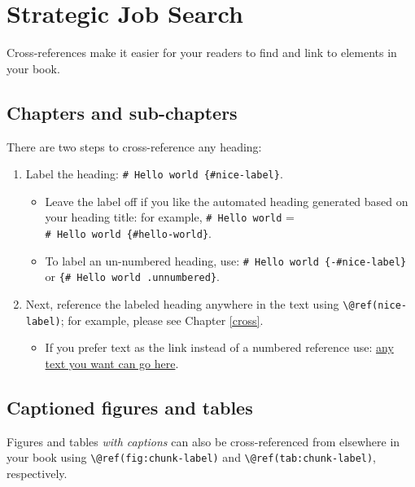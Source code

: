 \documentclass[
]{book}
\providecommand{\tightlist}{%
  \setlength{\itemsep}{0pt}\setlength{\parskip}{0pt}}
\theoremstyle{definition}
\theoremstyle{definition}
\theoremstyle{definition}
\theoremstyle{definition}
\theoremstyle{remark}
\begin{document}
\chapter{Strategic Job Search}\label{strategic-job-search}

Cross-references make it easier for your readers to find and link to elements in your book.

\section{Chapters and sub-chapters}\label{chapters-and-sub-chapters}

There are two steps to cross-reference any heading:

\begin{enumerate}
\def\labelenumi{\arabic{enumi}.}
\tightlist
\item
  Label the heading: \texttt{\#\ Hello\ world\ \{\#nice-label\}}.

  \begin{itemize}
  \tightlist
  \item
    Leave the label off if you like the automated heading generated based on your heading title: for example, \texttt{\#\ Hello\ world} = \texttt{\#\ Hello\ world\ \{\#hello-world\}}.
  \item
    To label an un-numbered heading, use: \texttt{\#\ Hello\ world\ \{-\#nice-label\}} or \texttt{\{\#\ Hello\ world\ .unnumbered\}}.
  \end{itemize}
\item
  Next, reference the labeled heading anywhere in the text using \texttt{\textbackslash{}@ref(nice-label)}; for example, please see Chapter \ref{cross}.

  \begin{itemize}
  \tightlist
  \item
    If you prefer text as the link instead of a numbered reference use: \hyperref[cross]{any text you want can go here}.
  \end{itemize}
\end{enumerate}

\section{Captioned figures and tables}\label{captioned-figures-and-tables}

Figures and tables \emph{with captions} can also be cross-referenced from elsewhere in your book using \texttt{\textbackslash{}@ref(fig:chunk-label)} and \texttt{\textbackslash{}@ref(tab:chunk-label)}, respectively.
\end{document}

